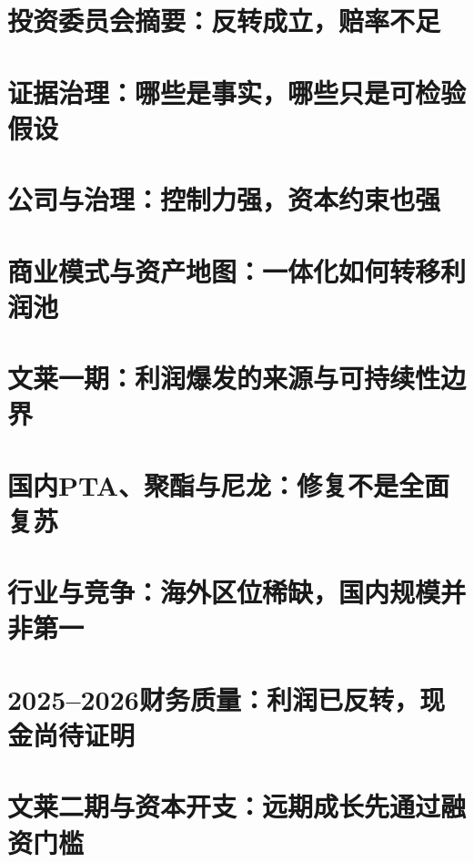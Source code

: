 \documentclass[a4paper,11pt,openany,fontset=none]{ctexrep}
\begin{document}
\astockcover

\tableofcontents
\clearpage

\chapter{投资委员会摘要：反转成立，赔率不足}


\chapter{证据治理：哪些是事实，哪些只是可检验假设}


\chapter{公司与治理：控制力强，资本约束也强}


\chapter{商业模式与资产地图：一体化如何转移利润池}


\chapter{文莱一期：利润爆发的来源与可持续性边界}


\chapter{国内PTA、聚酯与尼龙：修复不是全面复苏}


\chapter{行业与竞争：海外区位稀缺，国内规模并非第一}


\chapter{2025--2026财务质量：利润已反转，现金尚待证明}


\chapter{文莱二期与资本开支：远期成长先通过融资门槛}

\end{document}
